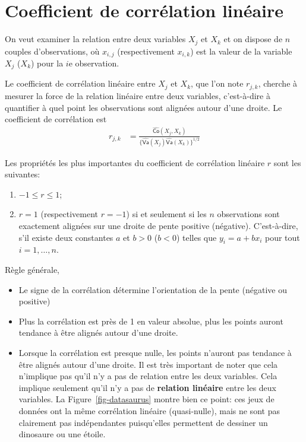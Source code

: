 \documentclass[
  11pt,
  letterpaper,
]{book}
\providecommand{\tightlist}{%
  \setlength{\itemsep}{0pt}\setlength{\parskip}{0pt}}\usepackage{longtable,booktabs,array}
\theoremstyle{definition}
\theoremstyle{remark}
\begin{document}
\hypertarget{coefficient-de-corruxe9lation-linuxe9aire}{%
\section{Coefficient de corrélation
linéaire}\label{coefficient-de-corruxe9lation-linuxe9aire}}

On veut examiner la relation entre deux variables \(X_j\) et \(X_k\) et
on dispose de \(n\) couples d'observations, où \(x_{i, j}\)
(respectivement \(x_{i, k}\)) est la valeur de la variable \(X_j\)
(\(X_k\)) pour la \(i\)e observation.

Le coefficient de corrélation linéaire entre \(X_j\) et \(X_k\), que
l'on note \(r_{j, k}\), cherche à mesurer la force de la relation
linéaire entre deux variables, c'est-à-dire à quantifier à quel point
les observations sont alignées autour d'une droite. Le coefficient de
corrélation est \begin{align*}
r_{j, k} &= \frac{\widehat{\mathsf{Co}}(X_j, X_k)}{\{\widehat{\mathsf{Va}}(X_j) \widehat{\mathsf{Va}}(X_k)\}^{1/2}} 
\end{align*}

Les propriétés les plus importantes du coefficient de corrélation
linéaire \(r\) sont les suivantes:

\begin{enumerate}
\def\labelenumi{\arabic{enumi})}
\tightlist
\item
  \(-1 \leq r \leq 1\);
\item
  \(r=1\) (respectivement \(r=-1\)) si et seulement si les \(n\)
  observations sont exactement alignées sur une droite de pente positive
  (négative). C'est-à-dire, s'il existe deux constantes \(a\) et \(b>0\)
  (\(b<0\)) telles que \(y_i=a+b x_i\) pour tout \(i=1, \ldots, n\).
\end{enumerate}

Règle générale,

\begin{itemize}
\tightlist
\item
  Le signe de la corrélation détermine l'orientation de la pente
  (négative ou positive)
\item
  Plus la corrélation est près de 1 en valeur absolue, plus les points
  auront tendance à être alignés autour d'une droite.
\item
  Lorsque la corrélation est presque nulle, les points n'auront pas
  tendance à être alignés autour d'une droite. Il est très important de
  noter que cela n'implique pas qu'il n'y a pas de relation entre les
  deux variables. Cela implique seulement qu'il n'y a pas de
  \textbf{relation linéaire} entre les deux variables. La
  Figure~\ref{fig-datasaurus} montre bien ce point: ces jeux de données
  ont la même corrélation linéaire (quasi-nulle), mais ne sont pas
  clairement pas indépendantes puisqu'elles permettent de dessiner un
  dinosaure ou une étoile.
\end{itemize}
\end{document}
